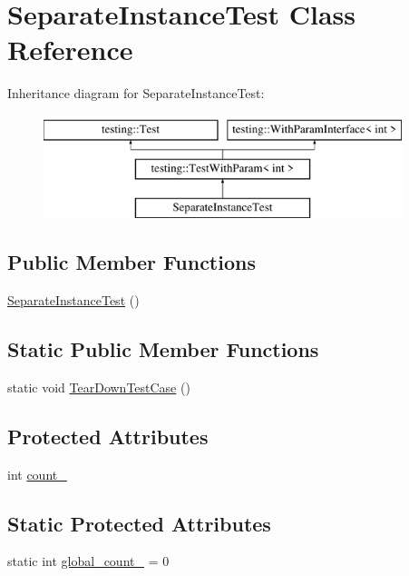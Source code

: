 \hypertarget{classSeparateInstanceTest}{}\section{Separate\+Instance\+Test Class Reference}
\label{classSeparateInstanceTest}
Inheritance diagram for Separate\+Instance\+Test\+:\begin{figure}[H]
\begin{center}
\leavevmode
\includegraphics[height=3.000000cm]{classSeparateInstanceTest}
\end{center}
\end{figure}
\subsection*{Public Member Functions}
\begin{DoxyCompactItemize}
\item 
\mbox{\hyperlink{classSeparateInstanceTest_a50a822b67bbc10d44701d213c2849b09}{Separate\+Instance\+Test}} ()
\end{DoxyCompactItemize}
\subsection*{Static Public Member Functions}
\begin{DoxyCompactItemize}
\item 
static void \mbox{\hyperlink{classSeparateInstanceTest_a7c4a72843a7c4a9be56adef27ecd33c7}{Tear\+Down\+Test\+Case}} ()
\end{DoxyCompactItemize}
\subsection*{Protected Attributes}
\begin{DoxyCompactItemize}
\item 
int \mbox{\hyperlink{classSeparateInstanceTest_a04af1b3b711671ecb0778af1330a740f}{count\+\_\+}}
\end{DoxyCompactItemize}
\subsection*{Static Protected Attributes}
\begin{DoxyCompactItemize}
\item 
static int \mbox{\hyperlink{classSeparateInstanceTest_a79db6d4cdd6c99b256439cc020f782ef}{global\+\_\+count\+\_\+}} = 0
\end{DoxyCompactItemize}
